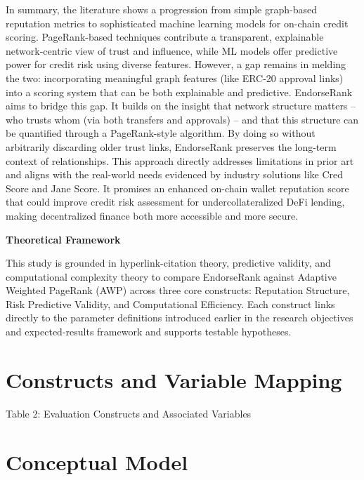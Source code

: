 \documentclass[
]{article}
\begin{document}
In summary, the literature shows a progression from simple graph-based reputation metrics to sophisticated machine learning models for on-chain credit scoring. PageRank-based techniques contribute a transparent, explainable network-centric view of trust and influence, while ML models offer predictive power for credit risk using diverse features. However, a gap remains in melding the two: incorporating meaningful graph features (like ERC-20 approval links) into a scoring system that can be both explainable and predictive. EndorseRank aims to bridge this gap. It builds on the insight that network structure matters -- who trusts whom (via both transfers and approvals) -- and that this structure can be quantified through a PageRank-style algorithm. By doing so without arbitrarily discarding older trust links, EndorseRank preserves the long-term context of relationships. This approach directly addresses limitations in prior art and aligns with the real-world needs evidenced by industry solutions like Cred Score and Jane Score. It promises an enhanced on-chain wallet reputation score that could improve credit risk assessment for undercollateralized DeFi lending, making decentralized finance both more accessible and more secure.

\textbf{Theoretical Framework}

This study is grounded in hyperlink-citation theory, predictive validity, and computational complexity theory to compare EndorseRank against Adaptive Weighted PageRank (AWP) across three core constructs: Reputation Structure, Risk Predictive Validity, and Computational Efficiency. Each construct links directly to the parameter definitions introduced earlier in the research objectives and expected-results framework and supports testable hypotheses.

\section{Constructs and Variable Mapping}\label{constructs-and-variable-mapping}

Table 2: Evaluation Constructs and Associated Variables

\section{}\label{section}

\section{Conceptual Model}\label{conceptual-model}
\end{document}
